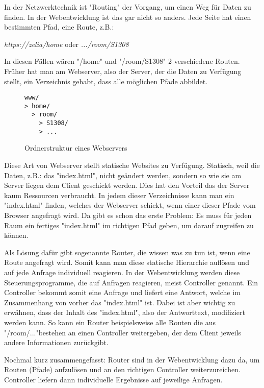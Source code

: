 \label{sec:csrouter}


In der Netzwerktechnik ist "Routing" der Vorgang, um einen Weg für Daten zu finden. In der Webentwicklung ist das gar nicht so anders. Jede Seite hat einen bestimmten Pfad, eine Route, z.B.:

\emph{https://zelia/home} oder \emph{.../room/S1308}

In diesen Fällen wären "/home" und "/room/S1308" 2 verschiedene Routen. Früher hat man am Webserver, also der Server, der die Daten zu Verfügung stellt, ein Verzeichnis gehabt, dass alle möglichen Pfade abbildet.

\begin{figure}[H]
    \begin{lstlisting}
www/
> home/
  > room/
    > S1308/
    > ...
    \end{lstlisting}
    \caption{Ordnerstruktur eines Webservers}
\end{figure}

Diese Art von Webserver stellt statische Websites zu Verfügung. Statisch, weil die Daten, z.B.: das "index.html", nicht geändert werden, sondern so wie sie am Server liegen dem Client geschickt werden. Dies hat den Vorteil das der Server kaum Ressourcen verbraucht. In jedem dieser Verzeichnisse kann man ein "index.html" finden, welches der Webserver schickt, wenn einer dieser Pfade vom Browser angefragt wird. Da gibt es schon das erste Problem: Es muss für jeden Raum ein fertiges "index.html" im richtigen Pfad geben, um darauf zugreifen zu können.

Als Lösung dafür gibt sogenannte Router, die wissen was zu tun ist, wenn eine Route angefragt wird. Somit kann man diese statische Hierarchie auflösen und auf jede Anfrage individuell reagieren. In der Webentwicklung werden diese Steuerungsprogramme, die auf Anfragen reagieren, meist Controller genannt. Ein Controller bekommt somit eine Anfrage und liefert eine Antwort, welche im Zusammenhang von vorher das "index.html" ist. Dabei ist aber wichtig zu erwähnen, dass der Inhalt des "index.html", also der Antworttext, modifiziert werden kann. So kann ein Router beispielsweise alle Routen die aus "/room/..."bestehen an einen Controller weitergeben, der dem Client jeweils andere Informationen zurückgibt.

Nochmal kurz zusammengefasst: Router sind in der Webentwicklung dazu da, um Routen (Pfade) aufzulösen und an den richtigen Controller weiterzureichen. Controller liefern dann individuelle Ergebnisse auf jeweilige Anfragen.

